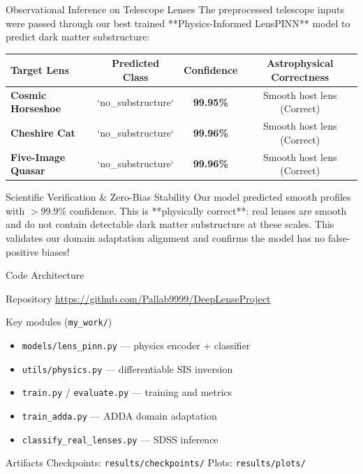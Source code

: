 \documentclass[10pt]{beamer}
\begin{document}
\begin{frame}{Observational Inference on Telescope Lenses}
    The preprocessed telescope inputs were passed through our best trained **Physics-Informed LensPINN** model to predict dark matter substructure:
    \vspace{0.2cm}
    \begin{table}
        \centering
        \small
        \begin{tabular}{lccc}
            \toprule
            \textbf{Target Lens} & \textbf{Predicted Class} & \textbf{Confidence} & \textbf{Astrophysical Correctness} \\
            \midrule
            \textbf{Cosmic Horseshoe} & `no\_substructure` & \textbf{99.95\%} & Smooth host lens (Correct) \\
            \textbf{Cheshire Cat} & `no\_substructure` & \textbf{99.96\%} & Smooth host lens (Correct) \\
            \textbf{Five-Image Quasar} & `no\_substructure` & \textbf{99.96\%} & Smooth host lens (Correct) \\
            \bottomrule
        \end{tabular}
    \end{table}
    \vspace{0.1cm}
    \begin{block}{Scientific Verification \& Zero-Bias Stability}
        Our model predicted smooth profiles with $>99.9\%$ confidence. This is **physically correct**: real lenses are smooth and do not contain detectable dark matter substructure at these scales. This validates our domain adaptation alignment and confirms the model has no false-positive biases!
    \end{block}
\end{frame}

\begin{frame}{Code Architecture}
    \begin{block}{Repository}
        \url{https://github.com/Pallab9999/DeepLenseProject}
    \end{block}
    \begin{block}{Key modules (\texttt{my\_work/})}
        \begin{itemize}
            \item \texttt{models/lens\_pinn.py} --- physics encoder + classifier
            \item \texttt{utils/physics.py} --- differentiable SIS inversion
            \item \texttt{train.py} / \texttt{evaluate.py} --- training and metrics
            \item \texttt{train\_adda.py} --- ADDA domain adaptation
            \item \texttt{classify\_real\_lenses.py} --- SDSS inference
        \end{itemize}
    \end{block}
    \begin{block}{Artifacts}
        Checkpoints: \texttt{results/checkpoints/} \quad Plots: \texttt{results/plots/}
    \end{block}
\end{frame}
\end{document}
